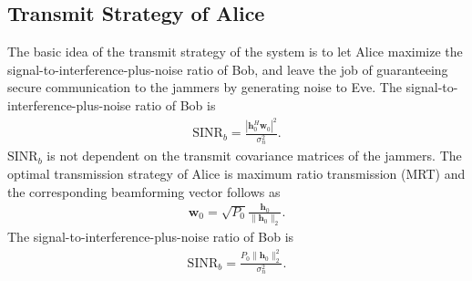 \documentclass[12pt, journal,onecolumn,draftclsnofoot]{IEEEtran}
\begin{document}
\subsection{Transmit Strategy of Alice}
The basic idea of the transmit strategy of the system is to let Alice maximize the signal-to-interference-plus-noise ratio of Bob, and leave the job of guaranteeing secure communication to the jammers by generating noise to Eve.  The signal-to-interference-plus-noise ratio of Bob is 
\begin{eqnarray}
\mathrm{SINR}_b= \frac{\left| \mathbf{h}_{0}^H\mathbf{w}_{0}\right|^2}{\sigma_n^2 }. 
\end{eqnarray}
$\mathrm{SINR}_b$ is not dependent on the transmit covariance matrices of the jammers. The optimal transmission strategy of Alice is maximum ratio transmission (MRT) and the corresponding beamforming vector follows as
\begin{eqnarray}
\mathbf{w}_0 = \sqrt{P_0}\frac{\mathbf{h}_0}{\|\mathbf{h}_0\|_2} \label{eq:optimal_w}.
\end{eqnarray}
The signal-to-interference-plus-noise ratio of Bob is
\begin{eqnarray} 
\mathrm{SINR}_b= \frac{P_0\| \mathbf{h}_{0}\|_2^2}{\sigma_n^2 }.  \label{eq:SINR_b}
\end{eqnarray}
\end{document}
